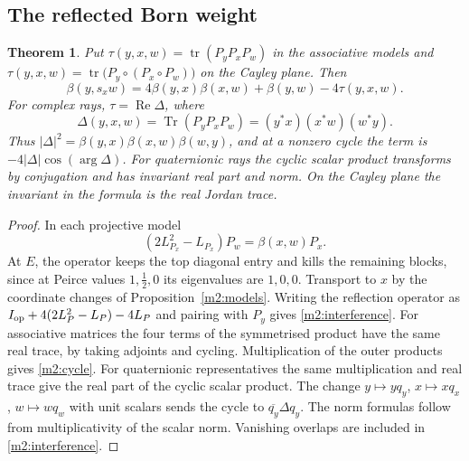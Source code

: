\documentclass[11pt,reqno]{amsart}
\newtheorem{theorem}{Theorem}[section]
\theoremstyle{definition}
\theoremstyle{remark}
\numberwithin{equation}{section}
\newcommand{\re}{\operatorname{Re}}
\begin{document}
\subsection{The reflected Born weight}

\begin{theorem}\label{m2:bargmann}
Put $\tau(y,x,w)=\operatorname{tr}(P_yP_xP_w)$ in the associative models and $\tau(y,x,w)=\operatorname{tr}\bigl(P_y\circ(P_x\circ P_w)\bigr)$
on the Cayley plane.  Then
\begin{equation}\label{m2:interference}
 \beta(y,s_xw)=4\beta(y,x)\beta(x,w)+\beta(y,w)-4\tau(y,x,w).
\end{equation}
For complex rays, $\tau=\re\Delta$, where
\begin{equation}\label{m2:cycle}
 \Delta(y,x,w)=\operatorname{Tr}(P_yP_xP_w)=(y^*x)(x^*w)(w^*y).
\end{equation}
Thus $|\Delta|^2=\beta(y,x)\beta(x,w)\beta(w,y)$, and at a nonzero cycle the term is $-4|\Delta|\cos(\arg\Delta)$.  For quaternionic rays
the cyclic scalar product transforms by conjugation and has invariant real part and norm.  On the Cayley plane the invariant in the formula
is the real Jordan trace.
\end{theorem}

\begin{proof}
In each projective model
\begin{equation}\label{m2:primitive}
 (2L_{P_x}^2-L_{P_x})P_w=\beta(x,w)P_x.
\end{equation}
At $E$, the operator keeps the top diagonal entry and kills the remaining blocks, since at Peirce values $1,\tfrac12,0$ its eigenvalues are
$1,0,0$.  Transport to $x$ by the coordinate changes of Proposition~\ref{m2:models}.  Writing the reflection operator as
$I_{\rm op}+4(2L_P^2-L_P)-4L_P$ and pairing with $P_y$ gives \eqref{m2:interference}.  For associative matrices the four terms of the
symmetrised product have the same real trace, by taking adjoints and cycling.  Multiplication of the outer products gives \eqref{m2:cycle}.
For quaternionic representatives the same multiplication and real trace give the real part of the cyclic scalar product.  The change
$y\mapsto yq_y$, $x\mapsto xq_x$, $w\mapsto wq_w$ with unit scalars sends the cycle to $\overline{q_y}\Delta q_y$.  The norm formulas follow
from multiplicativity of the scalar norm.  Vanishing overlaps are included in \eqref{m2:interference}.
\end{proof}
\end{document}
